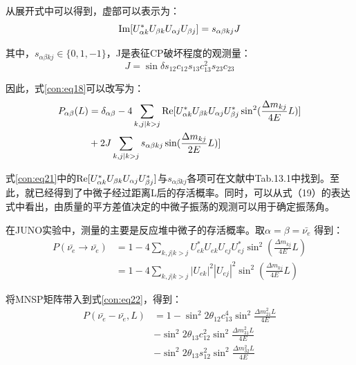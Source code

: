 \documentclass[10pt,a4paper]{article}
\begin{document}
从展开式中可以得到，虚部可以表示为：
\begin{equation}
\label{con:eq20}
{\rm Im}[U_{\alpha k}^{*}U_{\beta k}U_{\alpha j}U_{\beta j}]=s_{\alpha \beta kj}J
\end{equation}


其中，$s_{\alpha \beta kj}\in \{0,1,-1\}$，J是表征CP破坏程度的观测量：
\[
J=\sin\delta s_{12}c_{12}s_{13}c_{13}^2 s_{23}c_{23}
\]


因此，式\eqref{con:eq18}可以改写为：
\begin{equation}
\label{con:eq21}
\begin{aligned}
P_{\alpha\beta}(L)&=\delta_{\alpha\beta}-4\sum_{k,j |k>j}{\rm Re}[U_{\alpha k}^{*}U_{\beta k}U_{\alpha j}U_{\beta j}^{*}\sin^2(\frac{\Delta m_{kj}}{4E}L)]
\\&+2J\sum_{k,j |k>j}s_{\alpha \beta kj}\sin(\frac{\Delta m_{kj}}{2E}L)]
\end{aligned}
\end{equation}


式\eqref{con:eq21}中的${\rm Re}[U_{\alpha k}^{*}U_{\beta k}U_{\alpha j}U_{\beta j}^{*}]$与$s_{\alpha \beta kj}$各项可在文献\cite{2007fun}中Tab.13.1中找到。至此，就已经得到了中微子经过距离L后的存活概率。同时，可以从式（19）的表达式中看出，由质量的平方差值决定的中微子振荡的观测可以用于确定振荡角。


在JUNO实验中，测量的主要是反应堆中微子的存活概率。取$\alpha=\beta=\bar{\nu_e}$
得到：
\begin{equation}
\label{con:eq22}
\begin{split}
P(\bar{\nu_e}\rightarrow\bar{\nu_e})&=1-4\sum_{k,j |k>j}U_{e k}^{*}U_{e k}U_{e j}U_{e j}^{*}\sin^2(\frac{\Delta m_{kj}}{4E}L)
\\&=1-4\sum_{k,j |k>j}|U_{e k}|^2|U_{e j}|^2\sin^2(\frac{\Delta m_{kj}}{4E}L)
\end{split}
\end{equation}


将MNSP矩阵带入到式\eqref{con:eq22}，得到：
\begin{equation}
\label{con:eq23}
\begin{split}
P(\bar{\nu_e}-\bar{\nu_e},L)&=1-{\sin^2{2\theta_{12}}} c_{13}^4\sin^2{\frac{\Delta{m_{21}^2}L}{4E}}\\&-
\sin^2{2\theta_{13}} c_{12}^2\sin^2{\frac{\Delta{m_{31}^2}L}{4E}}
\\&-\sin^2{2\theta_{13}} s_{12}^2\sin^2{\frac{\Delta{m_{32}^2}L}{4E}}
\end{split}
\end{equation}
\end{document}
